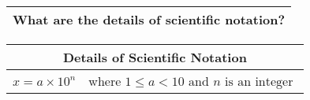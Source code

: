 
\begin{small}
    \begin{tabularx}{1\textwidth}{
            p{}
        }
        \toprule
        What are the details of scientific notation?
        \\
        \bottomrule
    \end{tabularx}
\end{small}

\begin{small}
\begin{tabularx}{1\textwidth}{
        p{}
        p{}
    }
    \toprule
    \multicolumn{2}{c}{Details of Scientific Notation} \\
    \midrule

    $ x = a \times 10^n $ 
    & where $1 \leq a < 10 \text{ and } n \text{ is an integer } $
    \\
    \bottomrule

\end{tabularx}
\end{small}
